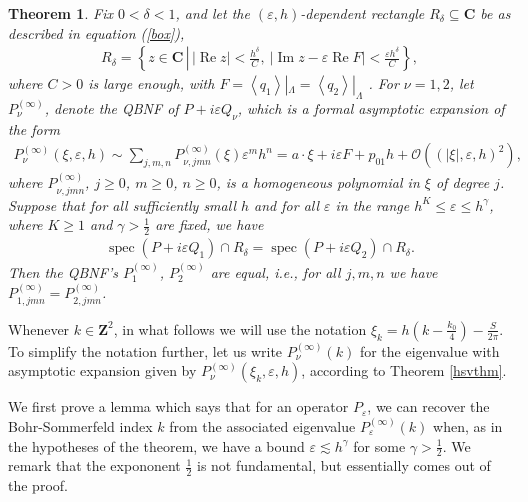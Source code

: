 \documentclass[12pt,lettersize]{article}
\DeclareMathOperator{\spec}{spec}
\DeclareMathOperator{\Real}{Re}
\DeclareMathOperator{\Imag}{Im}
\renewcommand{\epsilon}{\varepsilon}
\newcommand{\st}{\,|\,}
\theoremstyle{plain}%
\newtheorem{theorem}{Theorem}
\numberwithin{theorem}{section}
\numberwithin{equation}{section}
\theoremstyle{definition}
\theoremstyle{remark}
\begin{document}
{\begin{theorem}
Fix $0 < \delta < 1$, and let the $(\epsilon,h)$-dependent rectangle $R_\delta \subseteq \mathbf{C}$ be as described in equation (\ref{box}), 
%
\begin{align}\label{Rdelta}
  R_\delta = \left \{z \in \mathbf{C}\,\left|\, |\Real z| < \frac{h^\delta}{C},\ |\Imag z - \epsilon \Real F| < \frac{\epsilon h^\delta}{C}\right.\right \},
\end{align}
%
where $C > 0$ is large enough, with $F = \left\langle q_1 \right\rangle|_{\Lambda} = \left\langle q_2 \right\rangle|_{\Lambda}$ . For $\nu = 1,2$, let $P^{(\infty)}_\nu$, denote the QBNF of $P + i\epsilon Q_\nu$, which is a formal asymptotic expansion of the form 
%
\begin{align*}{}
P^{(\infty)}_\nu(\xi,\epsilon,h) \sim \sum_{j,m,n} P^{(\infty)}_{\nu,jmn}(\xi) \epsilon^m h^n = a\cdot \xi + i\epsilon F + p_{01}h + \mathcal{O}((|\xi|,\epsilon,h)^2), 
\end{align*}
%
where $P^{(\infty)}_{\nu,jmn}$, $j\geq 0$, $m \geq 0$, $n\geq 0$, is a homogeneous polynomial in $\xi$ of degree $j$. Suppose that for all sufficiently small $h$ and for all $\epsilon$ in the range $h^K \leq \epsilon \leq h^\gamma$, where $K \geq 1$ and $\gamma > \frac{1}{2}$ are fixed, we have
%
\begin{align*}{}
\spec(P+i\epsilon Q_1)\cap R_\delta = \spec(P+i\epsilon Q_2)\cap R_\delta. 
\end{align*}
%
Then the QBNF's $P^{(\infty)}_1$, $P^{(\infty)}_2$ are equal, i.e., for all $j,m,n$ we have $P^{(\infty)}_{1,jmn} = P^{(\infty)}_{2,jmn}$.
\end{theorem}

Whenever $k \in \mathbf{Z}^2$, in what follows we will use the notation $\xi_k = h(k-\frac{k_0}{4})- \frac{S}{2\pi}$. To simplify the notation further, let us write $P^{(\infty)}_\nu(k)$ for the eigenvalue with asymptotic expansion given by $P^{(\infty)}_\nu(\xi_k,\epsilon,h)$, according to Theorem \ref{hsvthm}.

We first prove a lemma which says that for an operator $P_\epsilon$, we can recover the Bohr-Sommerfeld index $k$ from the associated eigenvalue $P^{(\infty)}_\epsilon(k)$ when, as in the hypotheses of the theorem, we have a bound $\epsilon\lesssim  h^\gamma$ for some $\gamma> \frac{1}{2}$. We remark that the expononent $\frac{1}{2}$ is not fundamental, but essentially comes out of the proof.

}
\end{document}
